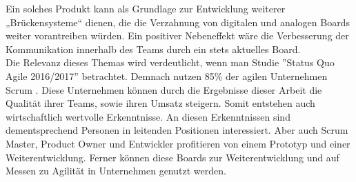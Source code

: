 \documentclass[12pt,titlepage]{scrartcl}
\begin{document}
Ein solches Produkt kann als Grundlage zur Entwicklung weiterer „Brückensysteme“ dienen, die die Verzahnung von digitalen und analogen Boards weiter vorantreiben würden. Ein positiver Nebeneffekt wäre die Verbesserung der Kommunikation innerhalb des Teams durch ein stets aktuelles Board. \\
Die Relevanz dieses Themas wird verdeutlicht, wenn man Studie ''Status Quo Agile 2016/2017'' betrachtet. Demnach nutzen 85\% der agilen Unternehmen Scrum \cite{hskob}. Diese Unternehmen können durch die Ergebnisse dieser Arbeit die Qualität ihrer Teams, sowie ihren Umsatz steigern. Somit entstehen auch wirtschaftlich wertvolle Erkenntnisse. An diesen Erkenntnissen sind dementsprechend Personen in leitenden Positionen interessiert. Aber auch Scrum Master, Product Owner und Entwickler profitieren von einem Prototyp und einer Weiterentwicklung. Ferner können diese Boards zur Weiterentwicklung und auf Messen zu Agilität in Unternehmen genutzt werden. 
\newpage


 	
\end{document}

